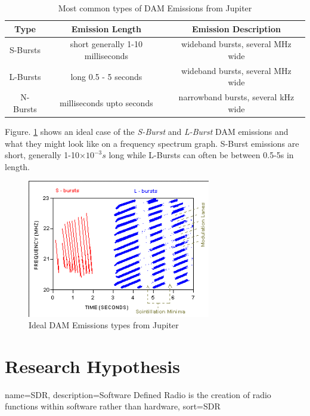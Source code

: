\documentclass[runningheads,a4paper]{llncs}
\begin{document}
%
\begin{table}
  \centering
  \begin{tabular}[pos]{| c | c | c |}
    \hline
    Type & Emission Length & Emission Description\\ \hline
    S-Bursts & short generally 1-10 milliseconds & wideband bursts, several MHz wide\\ \hline
    L-Bursts & long 0.5 - 5 seconds & wideband bursts, several MHz wide\\ \hline
    N-Bursts & milliseconds upto seconds & narrowband bursts, several kHz wide\\
    \hline
  \end{tabular}
  \caption{Most common types of DAM Emissions from Jupiter \citep{wilkinson94}}
  \label{tab:dam_emissions}
\end{table}
%

Figure. \ref{fig:dam_emissions_spectrum} shows an ideal case of the \textit{S-Burst} and \textit{L-Burst} \gls{DAM} emissions and what they might look like on a frequency spectrum graph. S-Burst emissions are short, generally 1-10$\times10^{-3}s$ long while L-Bursts can often be between 0.5-5s in length.

%
\begin{figure}[here]
\centering
\includegraphics[width=8cm]{images/05}
\caption{Ideal DAM Emissions types from Jupiter \citep{wilkinson94}}
\label{fig:dam_emissions_spectrum}
\end{figure}
%

%
\newpage
\section*{Research Hypothesis}
%
{
  name={SDR},
  description={Software Defined Radio is the creation of radio functions within software rather than hardware},
  sort=SDR
}
\end{document}
